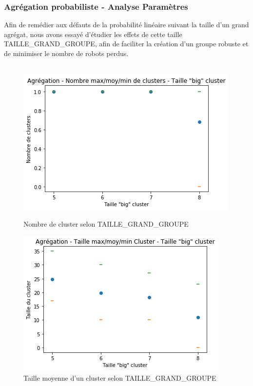 \documentclass[a4paper]{article}
\begin{document}
\subsubsection{Agrégation probabiliste - Analyse Paramètres}
Afin de remédier aux défauts de la probabilité linéaire suivant la taille d'un grand agrégat, nous avons essayé d'étudier les effets de cette taille TAILLE\_GRAND\_GROUPE, afin de faciliter la création d'un groupe robuste et de minimiser le nombre de robots perdus.\\ \\
\begin{figure}[h]
	\begin{minipage}[c]{.46\linewidth}
		\centering
		\includegraphics[width=1.1\linewidth]{../../script_results/Agregation_nombre_clusters_big_cluster.png}
		\caption{Nombre de cluster selon TAILLE\_GRAND\_GROUPE}
	\end{minipage}
	\hfill%
	\begin{minipage}[c]{.46\linewidth}
		\centering
		\includegraphics[width=1.1\linewidth]{../../script_results/Agregation_taille_big_cluster.png}
		\caption{Taille moyenne d'un cluster selon TAILLE\_GRAND\_GROUPE}
	\end{minipage}
\end{figure}
\end{document}

